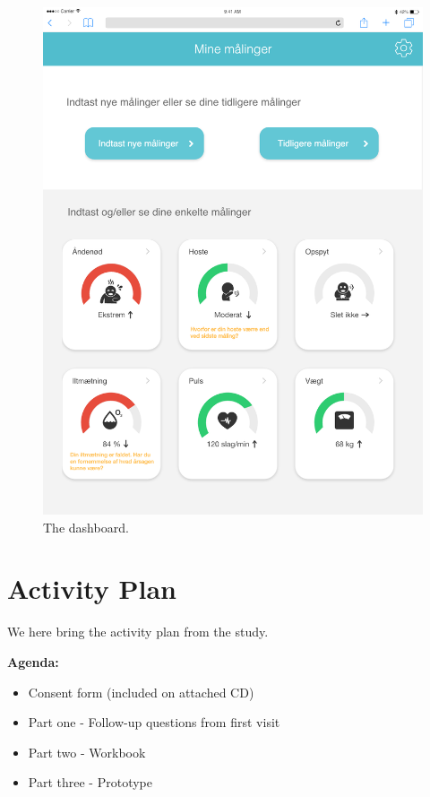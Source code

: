 \begin{figure}[h]
\centering
\includegraphics[scale=0.18]{images/study2/Dashboard.png}
\caption{The dashboard.}
\label{fig:dashboard}
\end{figure}

\FloatBarrier

\section{Activity Plan}

We here bring the activity plan from the study.

\textbf{Agenda:}
\begin{itemize}
\small \item Consent form (included on attached CD)
\item Part one - Follow-up questions from first visit
\item Part two - Workbook
\item Part three - Prototype 
\end{itemize}

